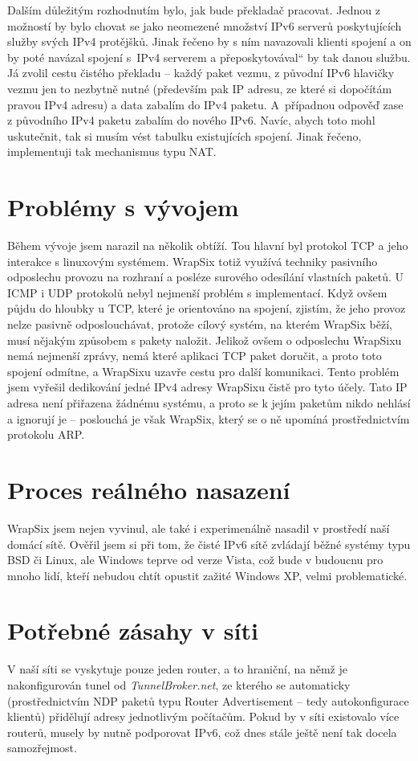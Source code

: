 \documentclass[12pt]{report}
\newcommand\uv[1]{\quotedblbase #1\textquotedblleft}
\begin{document}
Dalším důležitým rozhodnutím bylo, jak bude překladač pracovat. Jednou z možností by bylo chovat se jako neomezené množství IPv6 serverů poskytujících služby svých IPv4 protějšků. Jinak řečeno by s ním navazovali klienti spojení a on by poté navázal spojení s~IPv4 serverem a \uv{přeposkytovával} by tak danou službu. Já zvolil cestu čistého překladu -- každý paket vezmu, z původní IPv6 hlavičky vezmu jen to nezbytně nutné (především pak IP adresu, ze které si dopočítám pravou IPv4 adresu) a data zabalím do IPv4 paketu. A~případnou odpověď zase z původního IPv4 paketu zabalím do nového IPv6. Navíc, abych toto mohl uskutečnit, tak si musím vést tabulku existujících spojení. Jinak řečeno, implementuji tak mechanismus typu NAT.

\section{Problémy s vývojem}
Během vývoje jsem narazil na několik obtíží. Tou hlavní byl protokol TCP a jeho interakce s linuxovým systémem. WrapSix totiž využívá techniky pasivního odposlechu provozu na rozhraní a posléze surového odesílání vlastních paketů. U ICMP i UDP protokolů nebyl nejmenší problém s implementací. Když ovšem půjdu do hloubky u TCP, které je orientováno na spojení, zjistím, že jeho provoz nelze pasivně odposlouchávat, protože cílový systém, na kterém WrapSix běží, musí nějakým způsobem s pakety naložit. Jelikož ovšem o odposlechu WrapSixu nemá nejmenší zprávy, nemá které aplikaci TCP paket doručit, a proto toto spojení odmítne, a WrapSixu uzavře cestu pro další komunikaci. Tento problém jsem vyřešil dedikování jedné IPv4 adresy WrapSixu čistě pro tyto účely. Tato IP adresa není přiřazena žádnému systému, a proto se k jejím paketům nikdo nehlásí a ignorují je -- poslouchá je však WrapSix, který se o ně upomíná prostřednictvím protokolu ARP.

\section{Proces reálného nasazení}
WrapSix jsem nejen vyvinul, ale také i experimenálně nasadil v prostředí naší domácí sítě. Ověřil jsem si při tom, že čisté IPv6 sítě zvládají běžné systémy typu BSD či Linux, ale Windows teprve od verze Vista, což bude v budoucnu pro mnoho lidí, kteří nebudou chtít opustit zažité Windows XP, velmi problematické.

\section{Potřebné zásahy v síti}
V naší síti se vyskytuje pouze jeden router, a to hraniční, na němž je nakonfigurován tunel od \textit{TunnelBroker.net}, ze kterého se automaticky (prostřednictvím NDP paketů typu Router Advertisement -- tedy autokonfigurace klientů) přidělují adresy jednotlivým počítačům. Pokud by v síti existovalo více routerů, musely by nutně podporovat IPv6, což dnes stále ještě není tak docela samozřejmost.
\end{document}
